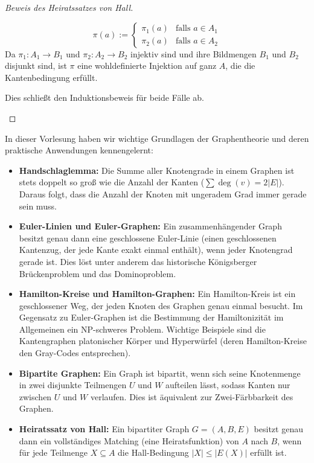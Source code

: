 \begin{proof}[Beweis des Heiratssatzes von Hall]
\begin{math-stroke}
\begin{enumerate}[label=\textbf{(\arabic*)}]
    \[
    \pi(a) := \begin{cases}
    \pi_1(a) & \text{falls } a \in A_1 \\
    \pi_2(a) & \text{falls } a \in A_2
    \end{cases}
    \]
    Da $\pi_1 \colon A_1 \to B_1$ und $\pi_2 \colon A_2 \to B_2$ injektiv sind und ihre Bildmengen $B_1$ und $B_2$ disjunkt sind, ist $\pi$ eine wohldefinierte Injektion auf ganz $A$, die die Kantenbedingung erfüllt.
\end{enumerate}
Dies schließt den Induktionsbeweis für beide Fälle ab.
\end{math-stroke}
\end{proof}

\begin{nice-box}
In dieser Vorlesung haben wir wichtige Grundlagen der Graphentheorie und deren praktische Anwendungen kennengelernt:
\begin{itemize}
    \item \textbf{Handschlaglemma:} Die Summe aller Knotengrade in einem Graphen ist stets doppelt so groß wie die Anzahl der Kanten ($\sum \deg(v) = 2|E|$). Daraus folgt, dass die Anzahl der Knoten mit ungeradem Grad immer gerade sein muss.
    \item \textbf{Euler-Linien und Euler-Graphen:} Ein zusammenhängender Graph besitzt genau dann eine geschlossene Euler-Linie (einen geschlossenen Kantenzug, der jede Kante exakt einmal enthält), wenn jeder Knotengrad gerade ist. Dies löst unter anderem das historische Königsberger Brückenproblem und das Dominoproblem.
    \item \textbf{Hamilton-Kreise und Hamilton-Graphen:} Ein Hamilton-Kreis ist ein geschlossener Weg, der jeden Knoten des Graphen genau einmal besucht. Im Gegensatz zu Euler-Graphen ist die Bestimmung der Hamiltonizität im Allgemeinen ein NP-schweres Problem. Wichtige Beispiele sind die Kantengraphen platonischer Körper und Hyperwürfel (deren Hamilton-Kreise den Gray-Codes entsprechen).
    \item \textbf{Bipartite Graphen:} Ein Graph ist bipartit, wenn sich seine Knotenmenge in zwei disjunkte Teilmengen $U$ und $W$ aufteilen lässt, sodass Kanten nur zwischen $U$ und $W$ verlaufen. Dies ist äquivalent zur Zwei-Färbbarkeit des Graphen.
    \item \textbf{Heiratssatz von Hall:} Ein bipartiter Graph $G = (A, B, E)$ besitzt genau dann ein vollständiges Matching (eine Heiratsfunktion) von $A$ nach $B$, wenn für jede Teilmenge $X \subseteq A$ die Hall-Bedingung $|X| \le |E(X)|$ erfüllt ist.
\end{itemize}
\end{nice-box}